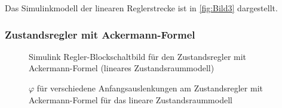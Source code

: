\documentclass[
	pagesize,
	fontsize=12pt,
	paper=a4,
	oneside,
   reqno
]{scrartcl}
\begin{document}
Das Simulinkmodell der linearen Reglerstrecke ist in \autoref{fig:Bild3} dargestellt.

\subsubsection{Zustandsregler mit Ackermann-Formel}

\begin{figure}[H]
    \centering
    \caption[Ackermann Regler Simulink (linear)]{Simulink Regler-Blockschaltbild für den Zustandsregler mit Ackermann-Formel (lineares Zustandsraummodell)}
    \label{fig:Bild11.5}
\end{figure}

\begin{figure}[H]
    \centering
    \caption[$\varphi$ für Regler mit Ackermann-Formel (linear)]{$\varphi$ für verschiedene Anfangsauslenkungen am Zustandsregler mit Ackermann-Formel für das lineare Zustandsraummodell}
    \label{fig:Bild12}
\end{figure}
\end{document}
